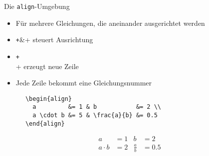 \begin{frame}[fragile]{Die \texttt{align}-Umgebung}
  \begin{itemize}
    \item Für mehrere Gleichungen, die aneinander ausgerichtet werden
    \item \texttt+&+ steuert Ausrichtung
    \item \texttt+\\+ erzeugt neue Zeile
    \item Jede Zeile bekommt eine Gleichungsnummer
  \end{itemize}
  \begin{CodeExample}{0.63}
    \begin{verbatim}
      \begin{align}
        a         &= 1 & b           &= 2 \\
        a \cdot b &= 5 & \frac{a}{b} &= 0.5
      \end{align}
    \end{verbatim}
  \CodeResult
    \begin{minipage}[c][4\baselineskip][c]{\textwidth}
      \begin{align}
        a         &= 1 & b           &= 2 \\
        a \cdot b &= 2 & \frac{a}{b} &= 0.5
      \end{align}
    \end{minipage}
  \end{CodeExample}
\end{frame}

